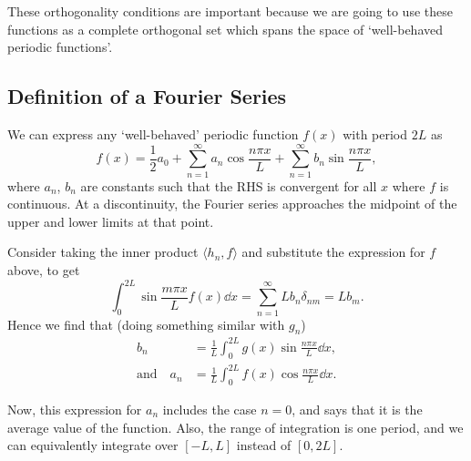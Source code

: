 \documentclass[a4paper]{scrartcl}
\begin{document}
These orthogonality conditions are important because we are going to use these functions as a complete orthogonal set which spans the space of `well-behaved periodic functions'.


\subsection{Definition of a Fourier Series}

We can express any `well-behaved' periodic function $f(x)$ with period $2L$ as
$$
f(x)=\frac{1}{2} a_{0}+\sum_{n=1}^{\infty} a_{n} \cos \frac{n \pi x}{L}+\sum_{n=1}^{\infty} b_{n} \sin \frac{n \pi x}{L},
$$
where $a_n$, $b_n$ are constants such that the RHS is convergent for all $x$ where $f$ is continuous. At a discontinuity, the Fourier series approaches the midpoint of the upper and lower limits at that point.

Consider taking the inner product $\langle h_n, f\rangle$ and substitute the expression for $f$ above, to get
$$
   \int_0^{2L} \sin \frac{m\pi x}{L} f(x) \dd x = \sum_{n = 1}^{\infty} L b_n \delta_{nm} = Lb_m.
$$
Hence we find that (doing something similar with $g_n$)
\begin{align*}
   b_n &= \frac{1}{L}\int_0^{2L} g(x) \sin \frac{n \pi x}{L} \dd x, \\
    \text{and} \quad a_n &= \frac{1}{L}\int_0^{2L} f(x) \cos \frac{n \pi x}{L} \dd x.
\end{align*}

Now, this expression for $a_n$ includes the case $n = 0$, and says that it is the average value of the function. Also, the range of integration is one period, and we can equivalently integrate over $[-L, L]$ instead of $[0, 2L]$.
\end{document}
